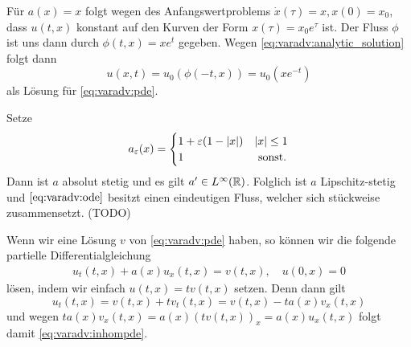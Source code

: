 \begin{example}
Für $a(x) = x$ folgt wegen des Anfangswertproblems $\dot x(\tau) = x, x(0) = x_0$, dass $u(t,x)$ konstant auf den Kurven der Form $x(\tau) = x_0 e^{\tau}$ ist.
Der Fluss $\phi$ ist uns dann durch $\phi(t,x) = x e^t$ gegeben. Wegen \eqref{eq:varadv:analytic_solution} folgt dann \[ u(x,t) = u_0(\phi(-t,x)) = u_0(x e^{-t}) \] als Lösung für \eqref{eq:varadv:pde}.
\end{example}
\begin{example} \label{ex:varadv:hat}
Setze
\[
a_\varepsilon(x) = \begin{cases} 
    1 + \varepsilon (1 - \left| x \right|) & \left| x \right| \leq 1\\
    1 & \text{ sonst.}
\end{cases}
\]
Dann ist $a$ absolut stetig und es gilt $a' \in L^\infty(\mathbb R)$.
Folglich ist $a$ Lipschitz-stetig und $\eqref{eq:varadv:ode}$ besitzt einen eindeutigen Fluss, welcher sich stückweise zusammensetzt. (TODO)
\end{example}





Wenn wir eine Lösung $v$ von \eqref{eq:varadv:pde} haben, so können wir die folgende partielle Differentialgleichung
\begin{align}\label{eq:varadv:inhompde}
u_t(t,x) + a(x) u_x(t,x) = v(t,x), \quad u(0,x) = 0
\end{align}
lösen, indem wir einfach $u(t,x) = t v(t,x)$ setzen. Denn dann gilt
\[ u_t(t,x) = v(t,x) + t v_t(t,x) = v(t,x) - t a(x) v_x(t,x) \]
und wegen $t a(x) v_x(t,x) = a(x) (t v(t,x))_x = a(x) u_x(t,x)$ folgt damit \eqref{eq:varadv:inhompde}.

